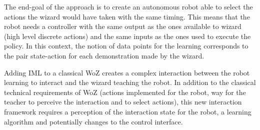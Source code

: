 \documentclass[manuscript, review, anonymous]{acmart}
\begin{document}
The end-goal of the approach is to create an autonomous robot able to select the
actions the wizard would have taken with the same timing. This means that the
robot needs a controller with the same output as the ones available to wizard
(high level discrete actions) and the same inputs as the ones used to execute
the policy. In this context, the notion of data points for the learning
corresponds to the pair state-action for each demonstration made by the wizard.

Adding IML to a classical WoZ %
creates a
complex interaction between the robot learning to interact and the wizard
teaching the robot.  In addition to the classical technical requirements of WoZ (actions
implemented for the robot, way for the teacher to perceive the interaction and
to select actions), this new interaction framework requires a perception of the
interaction state for the robot, a learning algorithm and potentially changes to 
the control interface.
\end{document}

